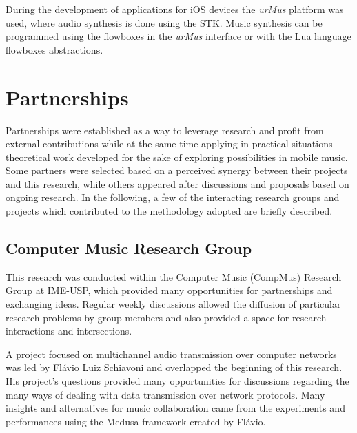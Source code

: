 During the development of applications for iOS devices the \textit{urMus} platform was used, where audio synthesis is done using the STK.
Music synthesis can be programmed using the flowboxes in the \textit{urMus} interface or with the Lua language flowboxes abstractions.


\section{Partnerships}
\label{sec:partnerships}
Partnerships were established as a way to leverage research and profit from external contributions while at the same time applying in practical situations theoretical work developed for the sake of exploring possibilities in mobile music.
Some partners were selected based on a perceived synergy between their projects and this research, while others appeared after discussions and proposals based on ongoing research. In the following, a few of the interacting research groups and projects which contributed to the methodology adopted are briefly described.

\subsection*{Computer Music Research Group}
This research was conducted within the Computer Music (CompMus) Research Group at IME-USP, which provided many opportunities for partnerships and exchanging ideas.
Regular weekly discussions allowed the diffusion of particular research problems by group members and also provided a space for research interactions and intersections.

A project focused on multichannel audio transmission over computer networks was led by Flávio Luiz Schiavoni and overlapped the beginning of this research.
His project's questions provided many opportunities for discussions regarding the many ways of dealing with data transmission over network protocols.
Many insights and alternatives for music collaboration came from the experiments and performances using the Medusa framework created by Flávio.

